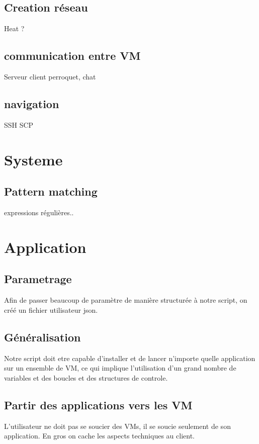 \documentclass{report}
\begin{document}
        \subsection{Creation réseau}
            Heat ?
        \subsection{communication entre VM}
            Serveur client perroquet, chat
        \subsection{navigation}
            SSH SCP
            
    \section{Systeme}
        \subsection{Pattern matching}
            expressions régulières.. 
            
    \section{Application}
        \subsection{Parametrage}
                Afin de passer beaucoup de paramètre de manière structurée à notre script, on créé un fichier utilisateur json.
        \subsection{Généralisation}
                Notre script doit etre capable d'installer et de lancer n'importe quelle application sur un ensemble de VM, ce qui implique
                l'utilisation d'un grand nombre de variables et des boucles et des structures de controle.
        \subsection{Partir des applications vers les VM}
                L'utilisateur ne doit pas se soucier des VMs, il se soucie seulement de son application. En gros on cache les aspects techniques au client.\break
        

\end{document}
